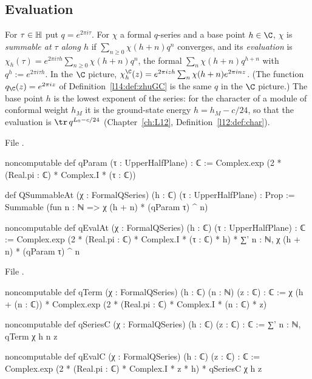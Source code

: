 \subsection{Evaluation}

\begin{definition}\label{l14:def:qeval}
For $\tau\in\mathbb{H}$ put $q = e^{2\pi i\tau}$. For $\chi$ a formal $q$-series and a base point $h\in\C$, $\chi$ is
\emph{summable at $\tau$ along $h$} if $\sum_{n\ge0}\chi(h+n)q^n$ converges, and its \emph{evaluation} is
$\chi_h(\tau) = e^{2\pi i\tau h}\sum_{n\ge0}\chi(h+n)q^n$, the formal $\sum_n\chi(h+n)q^{h+n}$ with $q^h := e^{2\pi i\tau h}$.
In the $\C$ picture, $\chi_h^{\C}(z) = e^{2\pi izh}\sum_n\chi(h+n)e^{2\pi inz}$. (The function $q_{\C}(z) = e^{2\pi iz}$ of
Definition~\ref{l14:def:zhuGC} is the same $q$ in the $\C$ picture.) The base point $h$ is the lowest exponent of the series:
for the character of a module of conformal weight $h_M$ it is the ground-state energy $h = h_M - c/24$, so that the evaluation
is $\tr\,q^{L_0-c/24}$ (Chapter~\ref{ch:L12}, Definition~\ref{l12:def:char}).
\end{definition}
\noindent File .
\begin{leancode}
noncomputable def qParam (τ : UpperHalfPlane) : ℂ :=
  Complex.exp (2 * (Real.pi : ℂ) * Complex.I * (τ : ℂ))

def QSummableAt (χ : FormalQSeries) (h : ℂ) (τ : UpperHalfPlane) : Prop :=
  Summable (fun n : ℕ => χ (h + n) * (qParam τ) ^ n)

noncomputable def qEvalAt (χ : FormalQSeries) (h : ℂ) (τ : UpperHalfPlane) : ℂ :=
  Complex.exp (2 * (Real.pi : ℂ) * Complex.I * (τ : ℂ) * h) *
    ∑' n : ℕ, χ (h + n) * (qParam τ) ^ n
\end{leancode}
\noindent File .
\begin{leancode}
noncomputable def qTerm (χ : FormalQSeries) (h : ℂ) (n : ℕ) (z : ℂ) : ℂ :=
  χ (h + (n : ℂ)) * Complex.exp (2 * (Real.pi : ℂ) * Complex.I * (n : ℂ) * z)

noncomputable def qSeriesC (χ : FormalQSeries) (h : ℂ) (z : ℂ) : ℂ := ∑' n : ℕ, qTerm χ h n z

noncomputable def qEvalC (χ : FormalQSeries) (h : ℂ) (z : ℂ) : ℂ :=
  Complex.exp (2 * (Real.pi : ℂ) * Complex.I * z * h) * qSeriesC χ h z
\end{leancode}
